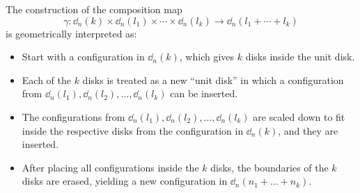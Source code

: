 \begin{egs}
\begin{enumerate}
            The construction of the composition map
            \[
            \gamma: \dd_n(k) \times \dd_n(l_1) \times \cdots \times \dd_n(l_k) \to \dd_n(l_1 + \cdots + l_k)
            \]
            is geometrically interpreted as:
            \begin{itemize}
                \item Start with a configuration in $\dd_n(k)$, which gives $k$
                disks inside the unit disk.
                \item Each of the $k$ disks is treated as a new ``unit disk'' in
                which a configuration from $\dd_n(l_1), \dd_n(l_2), \dots,
                \dd_n(l_k)$ can be inserted.
                \item The configurations from $\dd_n(l_1), \dd_n(l_2), \dots,
                \dd_n(l_k)$ are scaled down to fit inside the respective disks
                from the configuration in $\dd_n(k)$, and they are inserted.
                \item After placing all configurations inside the $k$ disks, the
                boundaries of the $k$ disks are erased, yielding a new
                configuration in $\dd_n(n_1 + \dots + n_k)$.
            \end{itemize}
            
            \begin{center}
\end{center}
\end{enumerate}
\end{egs}
